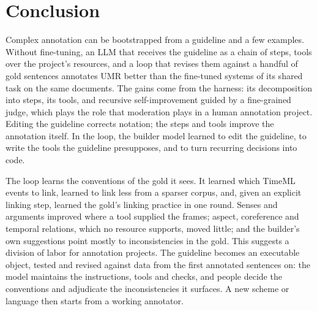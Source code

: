 \section{Conclusion}
\label{sec:conclusion}

Complex annotation can be bootstrapped from a guideline and a few examples. Without fine-tuning, an LLM that receives the guideline as a chain of steps, tools over the project's resources, and a loop that revises them against a handful of gold sentences annotates UMR better than the fine-tuned systems of its shared task on the same documents. The gains come from the harness: its decomposition into steps, its tools, and recursive self-improvement guided by a fine-grained judge, which plays the role that moderation plays in a human annotation project. Editing the guideline corrects notation; the steps and tools improve the annotation itself. In the loop, the builder model learned to edit the guideline, to write the tools the guideline presupposes, and to turn recurring decisions into code.

The loop learns the conventions of the gold it sees. It learned which TimeML events to link, learned to link less from a sparser corpus, and, given an explicit linking step, learned the gold's linking practice in one round. Senses and arguments improved where a tool supplied the frames; aspect, coreference and temporal relations, which no resource supports, moved little; and the builder's own suggestions point mostly to inconsistencies in the gold. This suggests a division of labor for annotation projects. The guideline becomes an executable object, tested and revised against data from the first annotated sentences on: the model maintains the instructions, tools and checks, and people decide the conventions and adjudicate the inconsistencies it surfaces. A new scheme or language then starts from a working annotator.
